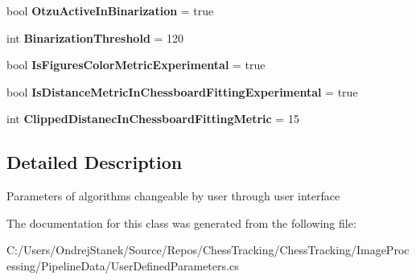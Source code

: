 \begin{DoxyCompactItemize}
\item 
\mbox{\label{class_chess_tracking_1_1_image_processing_1_1_pipeline_data_1_1_user_defined_parameters_a84c7818108f17a1f4c8990b112dc1144}} 
bool {\bfseries Otzu\+Active\+In\+Binarization} = true
\item 
\mbox{\label{class_chess_tracking_1_1_image_processing_1_1_pipeline_data_1_1_user_defined_parameters_a93ee30694b5e4c38a8cfe1b97343be0d}} 
int {\bfseries Binarization\+Threshold} = 120
\item 
\mbox{\label{class_chess_tracking_1_1_image_processing_1_1_pipeline_data_1_1_user_defined_parameters_a7b28dd7ff02b124db856b27a6b190b0a}} 
bool {\bfseries Is\+Figures\+Color\+Metric\+Experimental} = true
\item 
\mbox{\label{class_chess_tracking_1_1_image_processing_1_1_pipeline_data_1_1_user_defined_parameters_ae3561ac6e77b61a101ce355a3d6c7628}} 
bool {\bfseries Is\+Distance\+Metric\+In\+Chessboard\+Fitting\+Experimental} = true
\item 
\mbox{\label{class_chess_tracking_1_1_image_processing_1_1_pipeline_data_1_1_user_defined_parameters_a8763fb4601ac146eec80a42362a4647a}} 
int {\bfseries Clipped\+Distanec\+In\+Chessboard\+Fitting\+Metric} = 15
\end{DoxyCompactItemize}


\subsection{Detailed Description}
Parameters of algorithms changeable by user through user interface 



The documentation for this class was generated from the following file\+:\begin{DoxyCompactItemize}
\item 
C\+:/\+Users/\+Ondrej\+Stanek/\+Source/\+Repos/\+Chess\+Tracking/\+Chess\+Tracking/\+Image\+Processing/\+Pipeline\+Data/User\+Defined\+Parameters.\+cs\end{DoxyCompactItemize}
